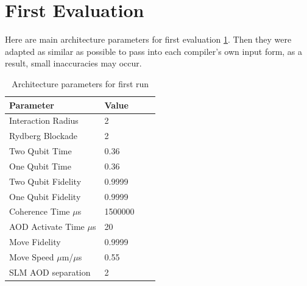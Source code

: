 \section{First Evaluation}
Here are main architecture parameters for first evaluation \ref{tab:architecture_first}. 
Then they were adapted as similar as possible to pass into each compiler's own input form, as a result, small inaccuracies may occur.
\begin{table}[htpb]
  \caption[Architecture First Run]{Architecture parameters for first run}\label{tab:architecture_first}
  \centering
  \begin{tabular}{l l l l}
    \toprule
      Parameter & Value \\
    \midrule
      Interaction Radius & 2 \\
      Rydberg Blockade & 2 \\
      Two Qubit Time & 0.36 \\
      One Qubit Time & 0.36 \\
      Two Qubit Fidelity & 0.9999 \\
      One Qubit Fidelity & 0.9999 \\
      Coherence Time $\mu$s & 1500000 \\
      AOD Activate Time $\mu$s & 20 \\
      Move Fidelity  & 0.9999 \\
      Move Speed $\mu$m/$\mu$s & 0.55 \\
      SLM AOD separation & 2\\
    \bottomrule
  \end{tabular}
\end{table}

